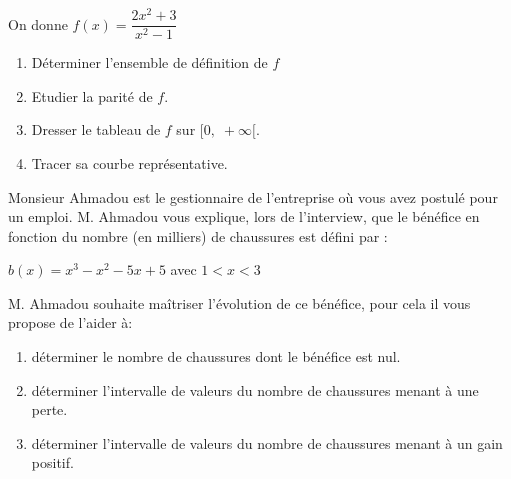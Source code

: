 \begin{exercice}
On donne $f(x)=\dfrac{2x^2+3}{x^2-1}$
\begin{enumerate}
\item Déterminer l'ensemble de définition de $ f $
\item Etudier la parité de $ f$.
\item Dresser le tableau de $ f $ sur $ [0,\; + \infty[ $.
\item Tracer sa courbe repr\'esentative.
\end{enumerate}
\end{exercice}
\begin{exercice}
Monsieur Ahmadou est le gestionnaire de l'entreprise où vous avez postulé pour un emploi. M. Ahmadou vous
explique, lors de l'interview, que le bénéfice en fonction du nombre (en milliers) de chaussures est défini par :

\medskip
 $ b(x)=x^3-x^2-5x+5 $\; avec \; $ 1<x<3 $

\medskip
M. Ahmadou souhaite maîtriser l'évolution de ce bénéfice, pour cela il vous propose de l'aider à:

\medskip
\begin{enumerate}
\item  déterminer le nombre de chaussures dont le bénéfice est nul.

\item  déterminer  l'intervalle de valeurs du nombre de chaussures menant à une perte.

\item déterminer  l'intervalle de valeurs du nombre de chaussures menant à un gain positif.
\end{enumerate}
\end{exercice}


